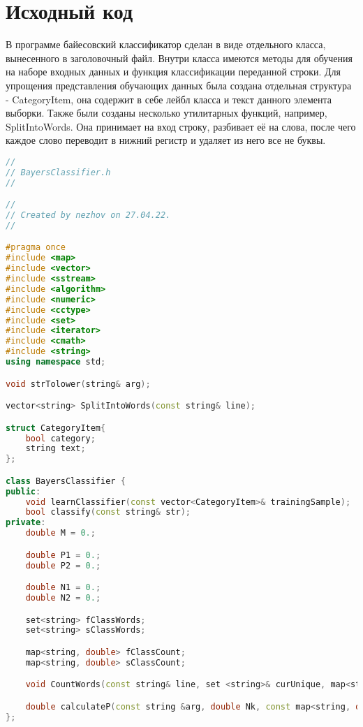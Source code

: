 \section{Исходный код}
В программе байесовский классификатор сделан в виде отдельного класса, вынесенного в заголовочный файл.
Внутри класса имеются методы для обучения на наборе входных данных и функция классификации переданной строки.
Для упрощения представления обучающих данных была создана отдельная структура - CategoryItem, она содержит в себе лейбл 
класса и текст данного элемента выборки. Также были созданы несколько утилитарных функций, например, SplitIntoWords. Она принимает на вход строку,
разбивает её на слова, после чего каждое слово переводит в нижний регистр и удаляет из него все не буквы.


\pagebreak
\begin{lstlisting}[language=C++]
//
// BayersClassifier.h
//

//
// Created by nezhov on 27.04.22.
//

#pragma once
#include <map>
#include <vector>
#include <sstream>
#include <algorithm>
#include <numeric>
#include <cctype>
#include <set>
#include <iterator>
#include <cmath>
#include <string>
using namespace std;

void strTolower(string& arg);

vector<string> SplitIntoWords(const string& line);

struct CategoryItem{
    bool category;
    string text;
};

class BayersClassifier {
public:
    void learnClassifier(const vector<CategoryItem>& trainingSample);
    bool classify(const string& str);
private:
    double M = 0.;

    double P1 = 0.;
    double P2 = 0.;

    double N1 = 0.;
    double N2 = 0.;

    set<string> fClassWords; 
    set<string> sClassWords; 

    map<string, double> fClassCount; 
    map<string, double> sClassCount; 

    void CountWords(const string& line, set <string>& curUnique, map<string, double>& curCount);

    double calculateP(const string &arg, double Nk, const map<string, double> &ClassCount, double Pq);
};




\end{lstlisting}

